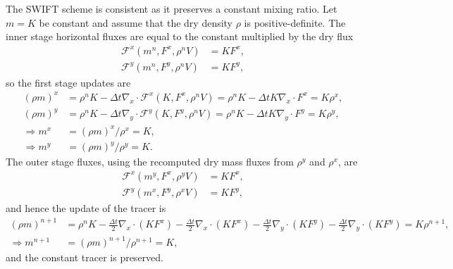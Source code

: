 \documentclass{ametsocV6.1}
\begin{document}
The SWIFT scheme is consistent as it preserves a constant mixing ratio. Let $m=K$ be constant and assume that the dry density $\rho$ is positive-definite. The inner stage horizontal fluxes are equal to the constant multiplied by the dry flux
\begin{subequations}
\begin{align}   
   \mathcal{F}^x(m^n,F^{x},\rho^nV) &= K F^x, \\
   \mathcal{F}^y(m^n,F^{y},\rho^nV) &= K F^y,
\end{align}
\end{subequations}
so the first stage updates are
\begin{subequations}
\begin{align}        
    (\rho m)^x &=\rho^n K - \Delta{t} \nabla_x\cdot \mathcal{F}^x(K,F^{x},\rho^nV) = \rho^n K - \Delta{t} K \nabla_x\cdot F^x = K \rho^x, \\
    (\rho m)^y &=\rho^n K - \Delta{t} \nabla_y\cdot \mathcal{F}^y(K,F^{y},\rho^nV) = \rho^n K - \Delta{t} K \nabla_y\cdot F^y = K \rho^y, \\
    \Rightarrow m^x &= (\rho m)^x / \rho^x = K, \\
    \Rightarrow m^y &= (\rho m)^y / \rho^y = K.
\end{align}
\end{subequations}
The outer stage fluxes, using the recomputed dry mass fluxes from $\rho^y$ and $\rho^x$, are
\begin{subequations}
\begin{align}
    \mathcal{F}^x(m^y,F^{x},\rho^yV) & = K F^x, \\
    \mathcal{F}^y(m^x,F^{y},\rho^xV) & = K F^y,
\end{align}
\end{subequations}
 and hence the update of the tracer is
 \begin{subequations}
\begin{align}
    (\rho m)^{n+1} &= \rho^n K -\frac{\Delta{t}}{2}\nabla_x\cdot (K F^x) -\frac{\Delta{t}}{2}\nabla_x\cdot (K F^x) -\frac{\Delta{t}}{2}\nabla_y\cdot (K F^y) -\frac{\Delta{t}}{2}\nabla_y\cdot (K F^y) = K \rho^{n+1}, \\
    \Rightarrow m^{n+1} &=  (\rho m)^{n+1}/ \rho^{n+1} = K,
\end{align}
\end{subequations}
and the constant tracer is preserved.
\end{document}
